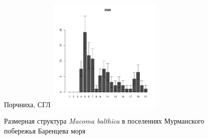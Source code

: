 \begin{figure}[hp]
	\hfil %
	\begin{minipage}[b]{.46\linewidth}
	\begin{center}
	{\footnotesize Порчниха, СГЛ}
	\includegraphics[width=55mm]{../Barenc_Sea/Porchnikha/sizestr2007.pdf}
	\end{center}
	\end{minipage}
\caption{Размерная структура {\it Macoma balthica} в поселениях Мурманского побережья Баренцева моря}
\label{ris:Barents_sizestr}
\end{figure}


